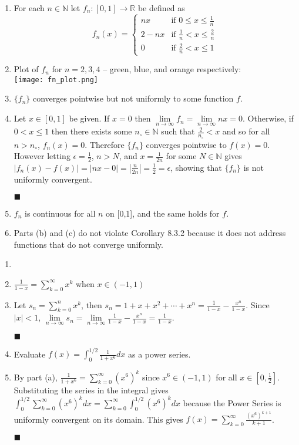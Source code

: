 \documentclass[a4paper,12pt]{report}
\newcommand{\bb}[1]{\mathbb{#1}}
\newcommand{\naught}[1]{{#1}_{\circ}}
\newcommand{\problem}[3]{
	\begin{enumerate}
		\item[\bf{Problem #1}] #2 
		#3
	\end{enumerate}
}
\newcommand{\subproof}[3]{
	\item[#1] #2
	\item[\bf{Proof:}] 
	#3 
	\begin{flushright}
		$\blacksquare$
	\end{flushright}
}
\begin{document}
\problem{4}{
	For each $n \in \bb{N}$ let $f_n : [0,1] \to \bb{R}$ be defined as \\
	\begin{displaymath}
		f_n(x) = \left\{
			\begin{array}{lr}
				nx & \text{if } 0 \leqslant x \leqslant \frac{1}{n} \\
				2 - nx & \text{if } \frac{1}{n} < x \leqslant \frac{2}{n} \\
				0 & \text{if } \frac{2}{n} < x \leqslant 1
			\end{array}
		\right.
	\end{displaymath}
}{
	\item[(a)] 
		Plot of $f_n$ for $n = 2, 3, 4$ -- green, blue, and orange respectively: \\
		\texttt{[image: fn\_plot.png]}
		
	\subproof{(b)}{
		$\{f_n\}$ converges pointwise but not uniformly to some function $f$.
	}{
		Let $x \in [0,1]$ be given. If $x = 0$ then $\lim\limits_{n \to \infty}f_n=\lim\limits_{n \to \infty}nx=0$. Otherwise, if $0 < x \leqslant 1$ then there exists some $\naught{n} \in \bb{N}$ such that $\frac{2}{\naught{n}} < x$ and so for all $n > \naught{n}$, $f_n(x) = 0$. Therefore $\{f_n\}$ converges pointwise to $f(x)=0$. However letting $\epsilon = \frac{1}{2}$, $n>N$, and $x = \frac{1}{2n}$ for some $N \in \bb{N}$ gives $|f_n(x)-f(x)| = |nx-0| = \left|\frac{n}{2n}\right| = \frac{1}{2} = \epsilon$, showing that $\{f_n\}$ is not uniformly convergent.
	}
	
	\item[(c)] 
		$f_n$ is continuous for all $n$ on [0,1], and the same holds for $f$.
	
	\item[(d)] 
		Parts (b) and (c) do not violate Corollary 8.3.2 because it does not address functions that do not converge uniformly.
}

\pagebreak

\problem{5}{}{
	\subproof{(a)}{
		$\frac{1}{1-x} = \sum\limits_{k=0}^{\infty}x^k$ when $x \in (-1,1)$
	}{
		Let $s_n = \sum\limits_{k=0}^{n}x^k$, then $s_n = 1 + x + x^2 + \cdots + x^n = \frac{1}{1-x} - \frac{x^n}{1-x}$. Since $|x| < 1$, $\lim\limits_{n \to \infty}s_n = \lim\limits_{n \to \infty}\frac{1}{1-x} - \frac{x^n}{1-x} = \frac{1}{1-x}$.
	}
	
	\subproof{(b)}{
		Evaluate $f(x)=\int_{0}^{1/2}\frac{1}{1+x^6}dx$ as a power series.
	}{
		By part (a), $\frac{1}{1+x^6} = \sum\limits_{k=0}^{\infty}(x^6)^k$ since $x^6 \in (-1,1)$ for all $x \in \left[0,\frac{1}{2}\right]$. Substituting the series in the integral gives $\int_{0}^{1/2}\sum\limits_{k=0}^{\infty}(x^6)^k dx = \sum\limits_{k=0}^{\infty}\int_{0}^{1/2}(x^6)^k dx$ because the Power Series is uniformly convergent on its domain. This gives $f(x) = \sum\limits_{k=0}^{\infty}\frac{(x^6)^{k+1}}{k+1}$.
	}
}
\end{document}
